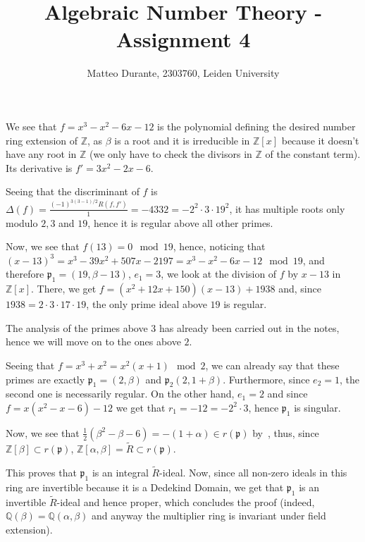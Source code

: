 \documentclass{article}
\newcommand{\numberset}{\mathbb}
\newcommand{\Z}{\numberset{Z}}
\newcommand{\Q}{\numberset{Q}}
\newcommand{\pid}{\mathfrak{p}}
\newcommand{\exercise}[1]{\noindent {\bf Exercise #1}}
\begin{document}
\title{Algebraic Number Theory - Assignment 4}

\author{Matteo Durante, 2303760, Leiden University}

\maketitle


\exercise{4}

We see that $f=x^3-x^2-6x-12$ is the polynomial defining the desired number ring extension of $\Z$, as $\beta$ is a root and it is irreducible in $\Z[x]$ because it doesn't have any root in $\Z$ (we only have to check the divisors in $\Z$ of the constant term). Its derivative is $f'=3x^2-2x-6$.

Seeing that the discriminant of $f$ is $\Delta(f)=\frac{(-1)^{3(3-1)/2}R(f,f')}{1}=-4332=-2^2\cdot 3\cdot 19^2$, it has multiple roots only modulo $2,3$ and $19$, hence it is regular above all other primes.

Now, we see that $f(13)=0\mod 19$, hence, noticing that $(x-13)^3=x^3-39x^2+507x-2197=x^3-x^2-6x-12\mod 19$, and therefore $\pid_1=(19,\beta-13)$, $e_1=3$, we look at the division of $f$ by $x-13$ in $\Z[x]$. There, we get $f=(x^2+12x+150)(x-13)+1938$ and, since $1938=2\cdot 3\cdot 17\cdot 19$, the only prime ideal above $19$ is regular.

The analysis of the primes above $3$ has already been carried out in the notes, hence we will move on to the ones above $2$.

Seeing that $f=x^3+x^2=x^2(x+1)\mod 2$, we can already say that these primes are exactly $\pid_1=(2,\beta)$ and $\pid_2(2,1+\beta)$. Furthermore, since $e_2=1$, the second one is necessarily regular. On the other hand, $e_1=2$ and since $f=x(x^2-x-6)-12$ we get that $r_1=-12=-2^2\cdot 3$, hence $\pid_1$ is singular.

Now, we see that $\frac{1}{2}(\beta^2-\beta-6)=-(1+\alpha)\in r(\pid)$ by~\cite[cor. 3.2]{stev}, thus, since $\Z[\beta]\subset r(\pid)$, $\Z[\alpha,\beta]=\tilde{R}\subset r(\pid)$.

This proves that $\pid_1$ is an integral $\tilde{R}$-ideal. Now, since all non-zero ideals in this ring are invertible because it is a Dedekind Domain, we get that $\pid_1$ is an invertible $\tilde{R}$-ideal and hence proper, which concludes the proof (indeed, $\Q(\beta)=\Q(\alpha,\beta)$ and anyway the multiplier ring is invariant under field extension).


~\\
\exercise{8}
\end{document}
